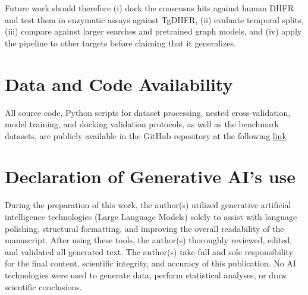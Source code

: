 Future work should therefore (i) dock the consensus hits against human DHFR and test them in enzymatic assays against TgDHFR, (ii) evaluate temporal splits, (iii) compare against larger searches and pretrained graph models, and (iv) apply the pipeline to other targets before claiming that it generalizes.

\section*{Data and Code Availability}

All source code, Python scripts for dataset processing, nested cross-validation, model training, and docking validation protocols, as well as the benchmark datasets, are publicly available in the GitHub repository at the following \href{https://github.com/aavzpy2023/MLvsGNN}{\underline{link}}

\section*{Declaration of Generative AI's use}

During the preparation of this work, the author(s) utilized generative artificial intelligence technologies (Large Language Models) solely to assist with language polishing, structural formatting, and improving the overall readability of the manuscript. After using these tools, the author(s) thoroughly reviewed, edited, and validated all generated text. The author(s) take full and sole responsibility for the final content, scientific integrity, and accuracy of this publication. No AI technologies were used to generate data, perform statistical analyses, or draw scientific conclusions.